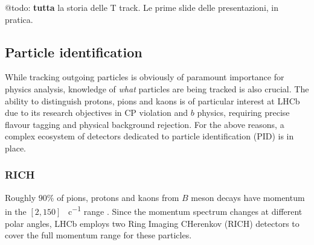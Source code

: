 @todo: \textbf{tutta} la storia delle T track. Le prime slide delle presentazioni, in pratica.

\subsection{Particle identification}
\label{sec:2:pid}
While tracking outgoing particles is obviously of paramount importance for physics analysis, knowledge of \textit{what} particles are being tracked is also crucial.
The ability to distinguish protons, pions and kaons is of particular interest at LHCb due to its research objectives in CP violation and $b$ physics, requiring precise flavour tagging and physical background rejection.
For the above reasons, a complex ecosystem of detectors dedicated to particle identification (PID) is in place.

\subsubsection{RICH}
Roughly $90\%$ of pions, protons and kaons from $B$ meson decays have momentum in the $[2,150]$ \si{\gev\per c} range \cite{HistoryLHCb}.
Since the momentum spectrum changes at different polar angles, LHCb employs two Ring Imaging CHerenkov (RICH) detectors \cite{Amato:494263} to cover the full momentum range for these particles.

